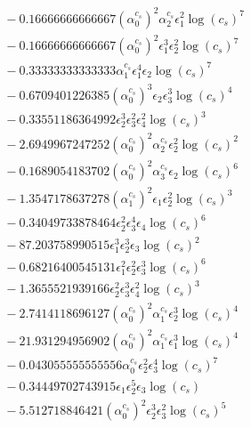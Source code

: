 \documentclass[10pt]{article}
\begin{document}
\begin{align*}
&{}  - 0.16666666666667 \left(\alpha_{0}^{c_s}\right)^{2} \alpha_{2}^{c_s} \epsilon_{1}^{2} \log{\left(c_{s} \right)}^{7} \\
&{}  - 0.16666666666667 \left(\alpha_{0}^{c_s}\right)^{2} \epsilon_{1}^{3} \epsilon_{2}^{2} \log{\left(c_{s} \right)}^{7} \\
&{}  - 0.33333333333333 \alpha_{1}^{c_s} \epsilon_{1}^{4} \epsilon_{2} \log{\left(c_{s} \right)}^{7} \\
&{}  - 0.6709401226385 \left(\alpha_{0}^{c_s}\right)^{3} \epsilon_{2} \epsilon_{3}^{3} \log{\left(c_{s} \right)}^{4} \\
&{}  - 0.33551186364992 \epsilon_{2}^{3} \epsilon_{3}^{2} \epsilon_{4}^{2} \log{\left(c_{s} \right)}^{3} \\
&{}  - 2.6949967247252 \left(\alpha_{0}^{c_s}\right)^{2} \alpha_{2}^{c_s} \epsilon_{2}^{2} \log{\left(c_{s} \right)}^{2} \\
&{}  - 0.1689054183702 \left(\alpha_{0}^{c_s}\right)^{2} \alpha_{3}^{c_s} \epsilon_{2} \log{\left(c_{s} \right)}^{6} \\
&{}  - 1.3547178637278 \left(\alpha_{1}^{c_s}\right)^{2} \epsilon_{1} \epsilon_{2}^{2} \log{\left(c_{s} \right)}^{3} \\
&{}  - 0.34049733878464 \epsilon_{2}^{2} \epsilon_{3}^{4} \epsilon_{4} \log{\left(c_{s} \right)}^{6} \\
&{}  - 87.203758990515 \epsilon_{1}^{3} \epsilon_{2}^{3} \epsilon_{3} \log{\left(c_{s} \right)}^{2} \\
&{}  - 0.68216400545131 \epsilon_{1}^{2} \epsilon_{2}^{2} \epsilon_{3}^{3} \log{\left(c_{s} \right)}^{6} \\
&{}  - 1.3655521939166 \epsilon_{2}^{2} \epsilon_{3}^{3} \epsilon_{4}^{2} \log{\left(c_{s} \right)}^{3} \\
&{}  - 2.7414118696127 \left(\alpha_{0}^{c_s}\right)^{2} \alpha_{1}^{c_s} \epsilon_{2}^{3} \log{\left(c_{s} \right)}^{4} \\
&{}  - 21.931294956902 \left(\alpha_{0}^{c_s}\right)^{2} \alpha_{1}^{c_s} \epsilon_{1}^{3} \log{\left(c_{s} \right)}^{4} \\
&{}  - 0.043055555555556 \alpha_{0}^{c_s} \epsilon_{2}^{2} \epsilon_{3}^{4} \log{\left(c_{s} \right)}^{7} \\
&{}  - 0.34449702743915 \epsilon_{1} \epsilon_{2}^{5} \epsilon_{3} \log{\left(c_{s} \right)} \\
&{}  - 5.512718846421 \left(\alpha_{0}^{c_s}\right)^{2} \epsilon_{2}^{3} \epsilon_{3}^{2} \log{\left(c_{s} \right)}^{5} \\

\end{align*}
\end{document}

